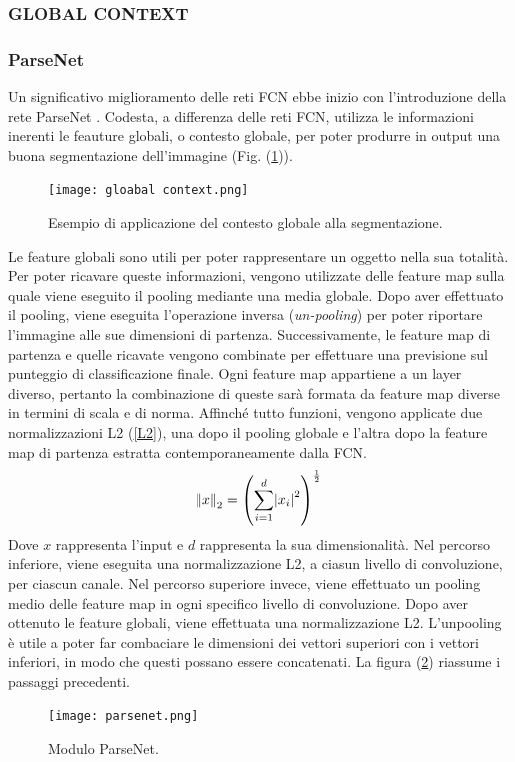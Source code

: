 \subsubsection{GLOBAL CONTEXT}
\subsubsection{ParseNet}
Un significativo miglioramento delle reti FCN ebbe inizio con l'introduzione della 
rete ParseNet \cite{parsenet}. Codesta, a differenza delle reti FCN, utilizza le informazioni 
inerenti le feauture globali, o contesto globale, per poter produrre in output una 
buona segmentazione dell'immagine (Fig. (\ref{global context})).
\begin{figure}
    \centering
    \texttt{[image: gloabal context.png]}
    \centering
    \caption{Esempio di applicazione del contesto globale alla segmentazione.}
    \label{global context}
\end{figure}
Le feature globali sono utili per poter rappresentare un oggetto nella sua 
totalità. Per poter ricavare queste informazioni, vengono utilizzate delle feature 
map sulla quale viene eseguito il pooling mediante una media globale. Dopo aver 
effettuato il pooling, viene eseguita l'operazione inversa (\emph{un-pooling}) per poter 
riportare l'immagine alle sue dimensioni di partenza. Successivamente, le feature 
map di partenza e quelle ricavate vengono combinate per effettuare una previsione 
sul punteggio di classificazione finale. Ogni feature map appartiene a un layer 
diverso, pertanto la combinazione di queste sarà formata da feature map diverse 
in termini di scala e di norma. Affinché tutto funzioni, vengono applicate due 
normalizzazioni L2 (\ref{L2}), una dopo il pooling globale e l'altra dopo la feature 
map di partenza estratta contemporaneamente dalla FCN. 
\begin{equation}\label{L2}
    \norm{x}_2 = \left(\sum_{i=1}^d \abs{x_i}^2 \right)^\frac{1}{2}
\end{equation}
Dove $x$ rappresenta l'input e $d$ rappresenta la sua dimensionalità. Nel percorso 
inferiore, viene eseguita una normalizzazione L2, a ciasun livello di convoluzione, 
per ciascun canale. Nel percorso superiore invece, viene effettuato un pooling 
medio delle feature map in ogni specifico livello di convoluzione. Dopo aver 
ottenuto le feature globali, viene effettuata una normalizzazione L2. L'unpooling 
è utile a poter far combaciare le dimensioni dei vettori superiori con i vettori 
inferiori, in modo che questi possano essere concatenati. La figura (\ref{parsenet}) riassume 
i passaggi precedenti.
\begin{figure}
    \centering
    \texttt{[image: parsenet.png]}
    \centering
    \caption{Modulo ParseNet.}
    \label{parsenet}
\end{figure}

